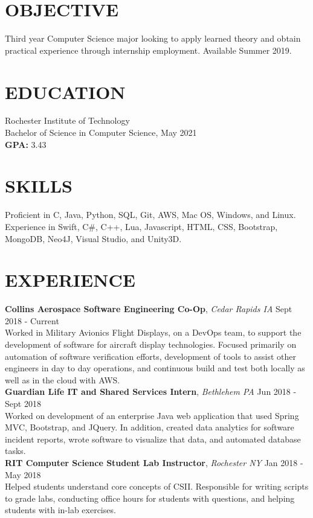 \documentclass[line, margin]{res}
\begin{document}
\address{(484) 554-8487\\ emp9173@rit.edu}

\begin{resume}

\section{OBJECTIVE}
Third year Computer Science major looking to apply learned theory and obtain practical experience through internship employment. Available Summer 2019.

\section{EDUCATION} 
 Rochester Institute of Technology \\
 Bachelor of Science in Computer Science, May 2021\\
 \textbf{GPA:} 3.43
 
\section{SKILLS}
Proficient in C, Java, Python, SQL, Git, AWS, Mac OS, Windows, and Linux. \\
Experience in Swift, C\#, C++, Lua, Javascript, HTML, CSS, Bootstrap, MongoDB, Neo4J, Visual Studio, and Unity3D.
 
\section{EXPERIENCE} 
\textbf{Collins Aerospace Software Engineering Co-Op}, \textit{Cedar Rapids IA} \hfill Sept 2018 - Current \\
Worked in Military Avionics Flight Displays, on a DevOps team, to support the development of software for aircraft display technologies.  Focused primarily on automation of software verification efforts, development of tools to assist other engineers in day to day operations, and continuous build and test both locally as well as in the cloud with AWS. \\ [10pt]
\textbf{Guardian Life IT and Shared Services Intern}, \textit{Bethlehem PA} \hfill Jun 2018 - Sept 2018 \\
Worked on development of an enterprise Java web application that used Spring MVC, Bootstrap, and JQuery.  In addition, created
data analytics for software incident reports, wrote software to visualize that data, and automated database tasks.\\ [10pt]
\textbf{RIT Computer Science Student Lab Instructor}, \textit{Rochester NY} \hfill Jan 2018 - May 2018 \\
Helped students understand core concepts of CSII. Responsible for writing scripts
to grade labs, conducting office hours for students with questions, and helping students
with in-lab exercises.


\end{resume}
\end{document}
